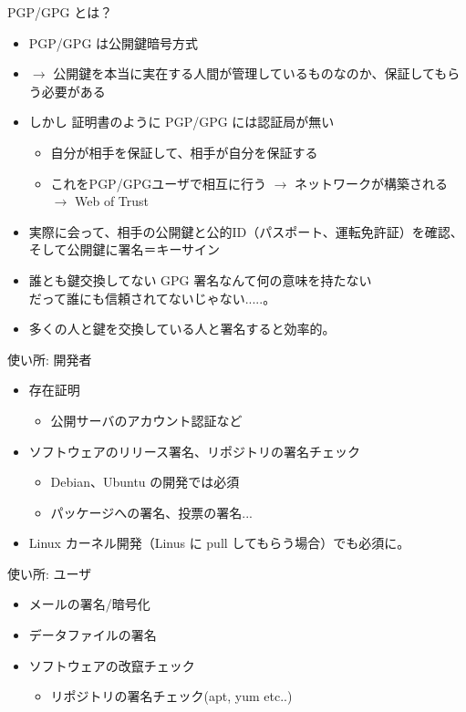 \begin{frame}{PGP/GPG とは？}
  \begin{itemize}[<+->]
    \item PGP/GPG は公開鍵暗号方式 
    \item $\rightarrow$ 公開鍵を本当に実在する人間が管理しているものなのか、保証してもらう必要がある
    \item しかし 証明書のように PGP/GPG には認証局が無い
    \begin{itemize}
      \item 自分が相手を保証して、相手が自分を保証する\\
      \item これをPGP/GPGユーザで相互に行う $\rightarrow$ ネットワークが構築される $\rightarrow$ Web of Trust
    \end{itemize}
    \item 実際に会って、相手の公開鍵と公的ID（パスポート、運転免許証）を確認、そして公開鍵に署名＝キーサイン
    \item 誰とも鍵交換してない GPG 署名なんて何の意味を持たない\\
          だって誰にも信頼されてないじゃない.....。
    \item 多くの人と鍵を交換している人と署名すると効率的。
  \end{itemize}
\end{frame}

\begin{frame}{使い所: 開発者}

\begin{itemize}
  \item 存在証明
  \begin{itemize}
    \item 公開サーバのアカウント認証など
  \end{itemize}
  \item ソフトウェアのリリース署名、リポジトリの署名チェック
  \begin{itemize}
    \item Debian、Ubuntu の開発では必須
    \item パッケージへの署名、投票の署名...
  \end{itemize}
  \item Linux カーネル開発（Linus に pull してもらう場合）でも必須に。
\end{itemize}
\end{frame}

\begin{frame}{使い所: ユーザ}
\begin{itemize}
  \item メールの署名/暗号化
  \item データファイルの署名
  \item ソフトウェアの改竄チェック
  \begin{itemize}
    \item リポジトリの署名チェック(apt, yum etc..)
  \end{itemize}
\end{itemize}
\end{frame}


